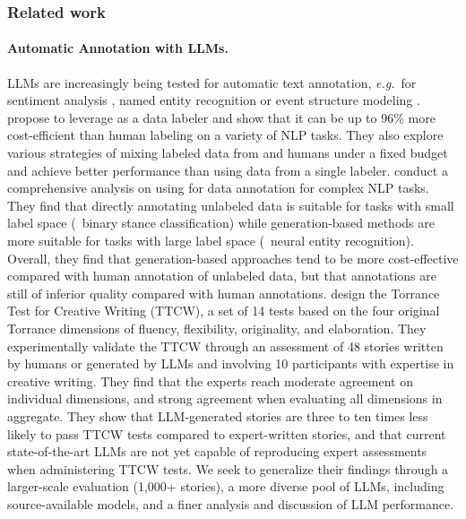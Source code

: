 \subsubsection{Related work}
\label{ssub:llm_related_work}

\paragraph{Automatic Annotation with LLMs.}
LLMs are increasingly being tested for automatic text annotation, \textit{e.g.}\ for sentiment analysis  \citep{qureshi2022novel}, named entity recognition \citep{enkhsaikhan2021auto} or event structure modeling \citep{vauth2021automated}.
\citet{wang2021want} propose to leverage {\gptthree} as a data labeler and show that it can be up to 96\% more cost-efficient than human labeling on a variety of NLP tasks. They also explore various strategies of mixing labeled data from {\gptthree} and humans under a fixed budget and achieve better performance than using data from a single labeler.
\citet{ding2022gpt} conduct a comprehensive analysis on using {\gptthree} for data annotation for complex NLP tasks. They find that directly annotating unlabeled data is suitable for tasks with small label space (\eg\ binary stance classification) while generation-based methods are more suitable for tasks with large label space (\eg\ neural entity recognition). Overall, they find that generation-based approaches tend to be more cost-effective compared with human annotation of unlabeled data, but that {\gptthree} annotations are still of inferior quality compared with human annotations.
\citet{chakrabarty2023art} design the Torrance Test for Creative Writing (TTCW), a set of 14 tests based on the four original Torrance dimensions of fluency, flexibility, originality, and elaboration. They experimentally validate the TTCW through an assessment of 48 stories written by humans or generated by LLMs and involving 10 participants with expertise in creative writing. They find that the experts reach moderate agreement on individual dimensions, and strong agreement when evaluating all dimensions in aggregate. They show that LLM-generated stories are three to ten times less likely to pass TTCW tests compared to expert-written stories, and that current state-of-the-art LLMs are not yet capable of reproducing expert assessments when administering TTCW tests. We seek to generalize their findings through a larger-scale evaluation (1,000+ stories), a more diverse pool of LLMs, including source-available models, and a finer analysis and discussion of LLM performance.

